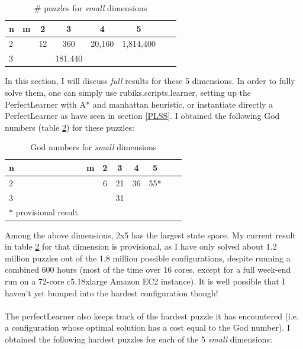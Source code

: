 \begin{table}[H]
\begin{center}
\begin{tabular}{l*{6}{c}r}
n              & m & 2 & 3 & 4 & 5\\
\hline
2              &   & 12 & 360 & 20,160 & 1,814,400 \\
3              &   &   & 181,440 &  &    \\
\end{tabular}
\caption{\label{tab:smallSP}\# puzzles for \textit{small} dimensions}
\end{center}
\end{table}
\noindent In this section, I will discuss \textit{full} results for these 5 dimensions. In order to fully solve them, one can simply use rubiks.scripts.learner, setting up the PerfectLearner with A* and manhattan heuristic, or instantiate directly a PerfectLearner as have seen in section \ref{PLSS}. I obtained the following God numbers (table \ref{tab:smallSPGN}) for these puzzles:
\begin{table}[H]
\begin{center}
\begin{tabular}{l*{6}{c}r}
n              & m & 2 & 3 & 4 & 5\\
\hline
2              &   & 6 & 21 & 36 & 55* \\
3              &   &   & 31 &  &    \\
* \tiny{provisional result}
\end{tabular}
\caption{\label{tab:smallSPGN}God numbers for \textit{small} dimensions}
\end{center}
\end{table}
\noindent Among the above dimensions, 2x5 has the largest state space. My current result in table \ref{tab:smallSPGN} for that dimension is provisional, as I have only solved about 1.2 million puzzles out of the 1.8 million possible configurations, despite running a combined 600 hours (most of the time over 16 cores, except for a full week-end run on a 72-core c5.18xlarge Amazon EC2 instance). It is well possible that I haven't yet bumped into the hardest configuration though!
\\
\\
The perfectLearner also keeps track of the hardest puzzle it has encountered (i.e. a configuration whose optimal solution has a cost equal to the God number). I obtained the following hardest puzzles for each of the 5 \textit{small} dimensions:
\\
\begin{three}
\centering
{}
\end{three}
\begin{five}
\end{five}
\begin{seven}
\end{seven}
\begin{nine}
\end{nine}
\begin{eight}
\end{eight}


